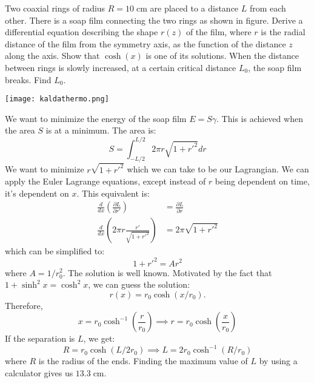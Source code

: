 \documentclass[11pt]{scrartcl}
\begin{document}
\begin{example}[2003 EstAcadPhO]
Two coaxial rings of radius $R = 10\;\mathrm{cm}$ are placed to a distance $L$ from each other. There is a soap film connecting the two rings as shown in figure. Derive a differential equation describing the shape $r(z)$ of the film, where $r$ is the radial distance of the film from the symmetry axis, as the function of the distance $z$ along the axis. Show that $\cosh (x)$ is one of its solutions. When the distance between rings is slowly increased, at a certain critical distance $L_0$, the soap film breaks. Find $L_0$.
\begin{center}
    \texttt{[image: kaldathermo.png]}
\end{center}
\end{example}
\begin{soln}
We want to minimize the energy of the soap film $E=S\gamma$. This is achieved when the area $S$ is at a minimum. The area is:
$$S=\int_{-L/2}^{L/2} 2\pi r\sqrt{1+r'^2} dr$$We want to minimize $r\sqrt{1+r'^2}$ which we can take to be our Lagrangian. We can apply the Euler Lagrange equations, except instead of $r$ being dependent on time, it's dependent on $x$. This equivalent is:
\begin{align*}
\frac{d}{dx}\left(\frac{\partial L}{\partial r'}\right)&=\frac{\partial L}{\partial r} \\
\frac{d}{dx}\left(2\pi r \frac{r'}{\sqrt{1+r'^2}}\right) &= 2\pi\sqrt{1+r'^2}
\end{align*}which can be simplified to:
$$1+r'^2=Ar^2$$where $A=1/r_0^2$. The solution is well known. Motivated by the fact that $1+\sinh^2x=\cosh^2x$, we can guess the solution:
$$r(x)=r_0\cosh (x/r_0).$$
Therefore, 
$$x=r_0\cosh^{-1}\left(\frac{r}{r_0}\right) \implies r = r_0\cosh\left(\frac{x}{r_0}\right)$$If the separation is $L$, we get:
$$R = r_0\cosh(L/2r_0) \implies L = 2r_0\cosh^{-1}\left(R/r_0\right)$$where $R$ is the radius of the ends. Finding the maximum value of $L$ by using a calculator gives us $13.3\;\mathrm{cm}$.
\end{soln}
\end{document}

